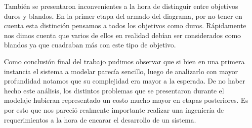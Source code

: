 \documentclass[a4paper,11pt] {article}
\begin{document}
Tambi\'en se presentaron inconvenientes a la hora de distinguir entre objetivos duros y blandos. En la primer etapa del armado del diagrama, por no tener en cuenta esta distinci\'on pensamos a todos los objetivos como duros. R\'apidamente nos dimos cuenta que varios de ellos en realidad deb\'ian ser considerados como blandos ya que cuadraban m\'as con este tipo de objetivo.

Como conclusi\'on final del trabajo pudimos observar que si bien en una primera instancia el sistema a modelar parec\'ia sencillo, luego de analizarlo con mayor profundidad notamos que su complejidad era mayor a la esperada. De no haber hecho este an\'alisis, los distintos problemas que se presentaron durante el modelaje hubieran representado un costo mucho mayor en etapas posteriores. Es por esto que nos pareci\'o realmente importante realizar una ingenier\'ia de requerimientos a la hora de encarar el desarrollo de un sistema.
\end{document}
